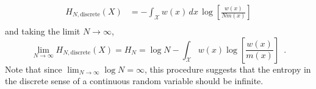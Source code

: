 %
\begin{align}
    H_{N,\text{discrete}}(X) &= - \int_\mathcal{X} w(x) \, dx \, \log \left[\frac{w(x)}{Nm(x)}\right] \nonumber \\
\end{align}
%
and taking the limit $N\rightarrow\infty$,
%
\begin{equation}
    \lim_{N\rightarrow\infty} H_{N,\text{discrete}}(X) = H_{N} = \log N - \int_\mathcal{X} w(x) \log \left[\frac{w(x)}{m(x)}\right] \enspace .
\end{equation}
%
Note that since $\lim_{N\rightarrow\infty} \log N = \infty$, this procedure suggests that the entropy in the discrete sense of a continuous random variable should be infinite.









